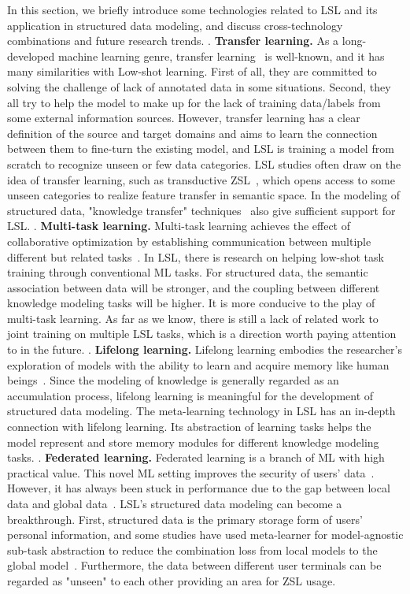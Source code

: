 \label{sec6}
In this section, we briefly introduce some technologies related to LSL and its application in structured data modeling, and discuss cross-technology combinations and future research trends.
\uppercase\expandafter{}. \textbf{Transfer learning.} As a long-developed machine learning genre, transfer learning~ is well-known, and it has many similarities with Low-shot learning. First of all, they are committed to solving the challenge of lack of annotated data in some situations. Second, they all try to help the model to make up for the lack of training data/labels from some external information sources. However, transfer learning has a clear definition of the source and target domains and aims to learn the connection between them  to fine-turn the existing model, and LSL is training a model from scratch to recognize unseen or few data categories. LSL studies often draw on the idea of transfer learning, such as transductive ZSL~, which opens access to some unseen categories to realize feature transfer in semantic space. In the modeling of structured data, "knowledge transfer" techniques~ also give sufficient support for LSL.
\uppercase\expandafter{}. \textbf{Multi-task learning.} Multi-task learning achieves the effect of collaborative optimization by establishing communication between multiple different but related tasks~. In LSL, there is research on helping low-shot task training through conventional ML tasks. For structured data, the semantic association between data will be stronger, and the coupling between different knowledge modeling tasks will be higher. It is more conducive to the play of multi-task learning. As far as we know, there is still a lack of related work to joint training on multiple LSL tasks, which is a direction worth paying attention to in the future.
\uppercase\expandafter{}. \textbf{Lifelong learning.} Lifelong learning embodies the researcher's exploration of models with the ability to learn and acquire memory like human beings~. Since the modeling of knowledge is generally regarded as an accumulation process, lifelong learning is meaningful for the development of structured data modeling. The meta-learning technology in LSL has an in-depth connection with lifelong learning. Its abstraction of learning tasks helps the model represent and store memory modules for different knowledge modeling tasks.
\uppercase\expandafter{}. \textbf{Federated learning.} Federated learning is a branch of ML with high practical value. This novel ML setting improves the security of users' data~. However, it has always been stuck in performance due to the gap between local data and global data~. LSL's structured data modeling can become a breakthrough. First, structured data is the primary storage form of users' personal information, and some studies have used meta-learner for model-agnostic sub-task abstraction to reduce the combination loss from local models to the global model~. Furthermore, the data between different user terminals can be regarded as "unseen" to each other providing an area for  ZSL usage.
